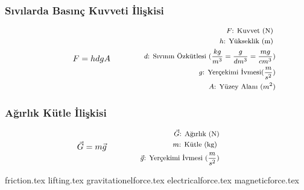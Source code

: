 \subsubsection*{Sıvılarda Basınç Kuvveti İlişkisi}
\begin{equation}
    F = hdgA \qquad \qquad \parbox{4cm}{\footnotesize$\begin{aligned}
        F\text{: Kuvvet (N) } \\
        h\text{: Yükseklik (m) } \\
        d\text{: Sıvının Özkütlesi } (\frac{kg}{m^3} = \frac{g}{dm^3} = \frac{mg}{cm^3})  \\
        g\text{: Yerçekimi İvmesi} (\frac{m}{s^2}) \\
        A\text{: Yüzey Alanı } (m^2)
\end{aligned}$}
\end{equation}

\subsubsection*{Ağırlık Kütle İlişkisi}
\begin{equation}
    \vec{G} = m\vec{g} \qquad \qquad \parbox{4cm}{\footnotesize$\begin{aligned}
        \vec{G}\text{: Ağırlık (N)} \\
        m\text{: Kütle (kg) } \\
        \vec{g}\text{: Yerçekimi İvmesi } (\frac{m}{s^2}) 
\end{aligned}$}
\end{equation}

{friction.tex}
{lifting.tex}
{gravitationelforce.tex}
{electricalforce.tex}
{magneticforce.tex}